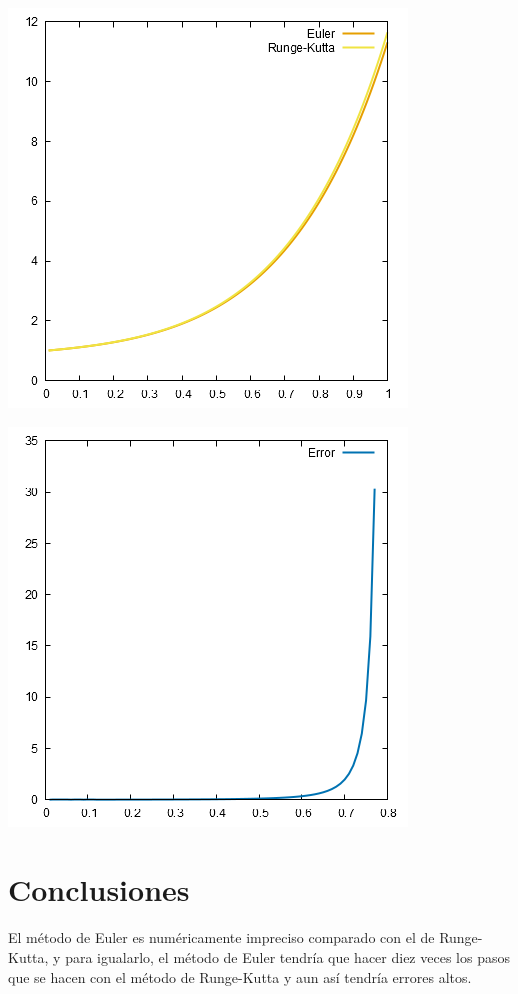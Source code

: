 \documentclass[10pt]{article}
\begin{document}
\begin{multicols}{2}
\begin{center}
				\includegraphics[scale=0.4]{../Graficas/10.png}
			\end{center}
			\begin{center}
				\includegraphics[scale=0.4]{../Graficas/1_1.png}
			\end{center}
		\section{Conclusiones}
			El método de Euler es numéricamente impreciso comparado con el de Runge-Kutta, y para igualarlo, el método de Euler tendría que hacer diez veces los pasos que se hacen con el método de Runge-Kutta y aun así tendría errores altos.
	\end{multicols}
	\appendix 
\end{document}
